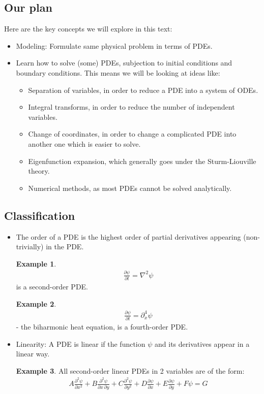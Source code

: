 \documentclass{article}
\theoremstyle{definition}
\newtheorem{exmp}{Example}[section]
\begin{document}
\subsection{Our plan}
Here are the key concepts we will explore in this text:
\begin{itemize}
	\item Modeling: Formulate same physical problem in terms of PDEs.
	\item Learn how to solve (some) PDEs, subjection to initial conditions and boundary conditions. This means we will be looking at ideas like:
	\begin{itemize}
		\item Separation of variables, in order to reduce a PDE into a system of ODEs.
		\item Integral transforms, in order to reduce the number of independent variables.
		\item Change of coordinates, in order to change a complicated PDE into another one which is easier to solve.
		\item Eigenfunction expansion, which generally goes under the Sturm-Liouville theory.
		\item Numerical methods, as most PDEs cannot be solved analytically. 
	\end{itemize}
\end{itemize}

\subsection{Classification}
\begin{itemize}
	\item The order of a PDE is the highest order of partial derivatives appearing (non-trivially) in the PDE.
	\begin{exmp}
		\begin{align*}
		\frac{\partial \psi}{\partial t} = \nabla^2\psi
		\end{align*}
		is a second-order PDE.
	\end{exmp}
	\begin{exmp}
		\begin{align*}
		\frac{\partial \psi}{\partial t} = \partial^4_x\psi
		\end{align*}
		- the biharmonic heat equation, is a fourth-order PDE.
	\end{exmp}
	\item Linearity: A PDE is linear if the function $\psi$ and its derivatives appear in a linear way.
	\begin{exmp}
		All second-order linear PDEs in 2 variables are of the form:
		\begin{align*}
		\boxed{A\frac{\partial^2 \psi}{\partial x^2} + B\frac{\partial^2 \psi}{\partial x\,\partial y} + C\frac{\partial^2 \psi}{\partial y^2} + D\frac{\partial \psi}{\partial x} + E\frac{\partial \psi}{\partial y} + F\psi = G}
		\end{align*}
	\end{exmp}
\end{itemize}
\end{document}
